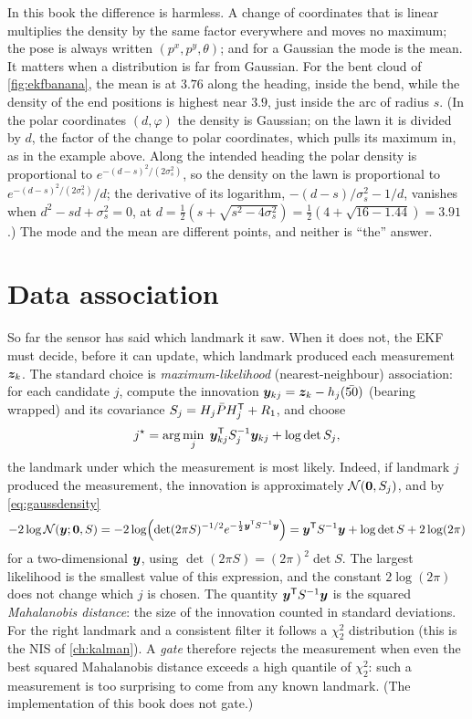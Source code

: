In this book the difference is harmless. A change of coordinates that is
linear multiplies the density by the same factor everywhere and moves no
maximum; the pose is always written $(p^x,p^y,\theta)$; and for a Gaussian
the mode is the mean. It matters when a distribution is far from Gaussian.
For the bent cloud of \cref{fig:ekfbanana}, the mean is at $3.76$ along
the heading, inside the bend, while the density of the end positions is
highest near $3.9$, just inside the arc of radius $s$. (In the polar
coordinates $(d,\varphi)$ the density is Gaussian; on the lawn it is
divided by $d$, the factor of the change to polar coordinates, which pulls
its maximum in, as in the example above. Along the intended heading
the polar density is proportional to $e^{-(d-s)^2/(2\sigma_s^2)}$, so
the density on the lawn is proportional to
$e^{-(d-s)^2/(2\sigma_s^2)}/d$; the derivative of its logarithm,
$-(d-s)/\sigma_s^2-1/d$, vanishes when $d^2-sd+\sigma_s^2=0$, at
$d=\tfrac12(s+\sqrt{s^2-4\sigma_s^2})=\tfrac12(4+\sqrt{16-1.44})=3.91$.)
The mode and the mean are different points, and neither is ``the''
answer.

\section{Data association}
\label{sec:ekf-association}

So far the sensor has said which landmark it saw. When it does not, the
EKF must decide, before it can update, which landmark produced each
measurement $\bm{z}_k$. The standard choice is \emph{maximum-likelihood}
(nearest-neighbour) association: for each candidate $j$, compute the
innovation $\bm{y}_{kj}=\bm{z}_k-h_j(\bar{50})$ (bearing wrapped) and its covariance
$S_j=H_j\bar PH_j^{\mathsf{T}}+R_1$, and choose
\[
  j^\star=\arg\min_j\;\bm{y}_{kj}^{\mathsf{T}} S_j^{-1}\bm{y}_{kj}+\log\det S_j,
\]
the landmark under which the measurement is most likely. Indeed, if landmark $j$ produced the measurement, the innovation is
approximately $\mathcal{N}(\bm{0},S_j)$, and by \eqref{eq:gaussdensity}
\[
  -2\log\mathcal{N}(\bm{y};\bm{0},S)
  =-2\log\Bigl(\det(2\pi S)^{-1/2}e^{-\frac12\bm{y}^{\mathsf{T}} S^{-1}\bm{y}}\Bigr)
  =\bm{y}^{\mathsf{T}} S^{-1}\bm{y}+\log\det S+2\log(2\pi)
\]
for a two-dimensional $\bm{y}$, using $\det(2\pi S)=(2\pi)^2\det S$. The
largest likelihood is the smallest value of this expression, and the
constant $2\log(2\pi)$ does not change which $j$ is chosen. The quantity $\bm{y}^{\mathsf{T}} S^{-1}\bm{y}$ is the squared
\emph{Mahalanobis distance}: the size of the innovation counted in
standard deviations. For the right landmark and a consistent filter it
follows a $\chi^2_2$ distribution (this is the NIS of
\cref{ch:kalman}). A \emph{gate} therefore rejects the measurement when
even the best squared Mahalanobis distance exceeds a high quantile of
$\chi^2_2$: such a measurement is too surprising to come from any known
landmark. (The implementation of this book does not gate.)

